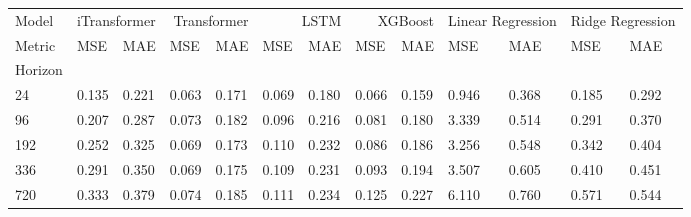 \begin{tabular}{lllllllllllll}
\toprule
Model & \multicolumn{2}{r}{iTransformer} & \multicolumn{2}{r}{Transformer} & \multicolumn{2}{r}{LSTM} & \multicolumn{2}{r}{XGBoost} & \multicolumn{2}{r}{Linear Regression} & \multicolumn{2}{r}{Ridge Regression} \\
Metric & MSE & MAE & MSE & MAE & MSE & MAE & MSE & MAE & MSE & MAE & MSE & MAE \\
Horizon &  &  &  &  &  &  &  &  &  &  &  &  \\
\midrule
24 & 0.135 & 0.221 & 0.063 & 0.171 & 0.069 & 0.180 & 0.066 & 0.159 & 0.946 & 0.368 & 0.185 & 0.292 \\
96 & 0.207 & 0.287 & 0.073 & 0.182 & 0.096 & 0.216 & 0.081 & 0.180 & 3.339 & 0.514 & 0.291 & 0.370 \\
192 & 0.252 & 0.325 & 0.069 & 0.173 & 0.110 & 0.232 & 0.086 & 0.186 & 3.256 & 0.548 & 0.342 & 0.404 \\
336 & 0.291 & 0.350 & 0.069 & 0.175 & 0.109 & 0.231 & 0.093 & 0.194 & 3.507 & 0.605 & 0.410 & 0.451 \\
720 & 0.333 & 0.379 & 0.074 & 0.185 & 0.111 & 0.234 & 0.125 & 0.227 & 6.110 & 0.760 & 0.571 & 0.544 \\
\bottomrule
\end{tabular}
